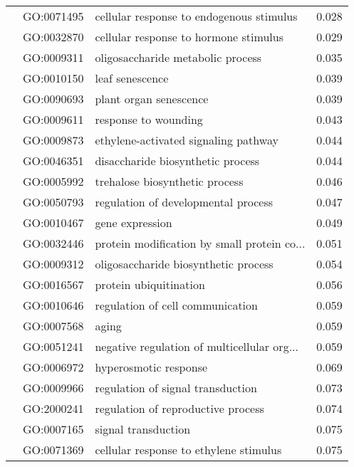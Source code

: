 \begin{longtable}{lllr}
   & GO:0071495 &     cellular response to endogenous stimulus &         0.028 \\
   & GO:0032870 &        cellular response to hormone stimulus &         0.029 \\
   & GO:0009311 &            oligosaccharide metabolic process &         0.035 \\
   & GO:0010150 &                              leaf senescence &         0.039 \\
   & GO:0090693 &                       plant organ senescence &         0.039 \\
   & GO:0009611 &                         response to wounding &         0.043 \\
   & GO:0009873 &         ethylene-activated signaling pathway &         0.044 \\
   & GO:0046351 &            disaccharide biosynthetic process &         0.044 \\
   & GO:0005992 &               trehalose biosynthetic process &         0.046 \\
   & GO:0050793 &          regulation of developmental process &         0.047 \\
   & GO:0010467 &                              gene expression &         0.049 \\
   & GO:0032446 &  protein modification by small protein co... &         0.051 \\
   & GO:0009312 &         oligosaccharide biosynthetic process &         0.054 \\
   & GO:0016567 &                       protein ubiquitination &         0.056 \\
   & GO:0010646 &             regulation of cell communication &         0.059 \\
   & GO:0007568 &                                        aging &         0.059 \\
   & GO:0051241 &  negative regulation of multicellular org... &         0.059 \\
   & GO:0006972 &                        hyperosmotic response &         0.069 \\
   & GO:0009966 &            regulation of signal transduction &         0.073 \\
   & GO:2000241 &           regulation of reproductive process &         0.074 \\
   & GO:0007165 &                          signal transduction &         0.075 \\
   & GO:0071369 &       cellular response to ethylene stimulus &         0.075 \\

\end{longtable}
